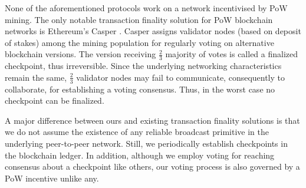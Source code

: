 None of the aforementioned protocols work on a network incentivised by PoW mining. The only notable transaction finality solution for PoW blockchain networks is Ethereum's Casper \cite{casper-gadget}. Casper assigns validator nodes (based on deposit of stakes) among the mining population for regularly voting on alternative blockchain versions. The version receiving $\frac{2}{3}$ majority of votes is called a finalized checkpoint, thus irreversible. Since the underlying networking characteristics remain the same, $\frac{2}{3}$ validator nodes may fail to communicate, consequently to collaborate, for establishing a voting consensus. Thus, in the worst case no checkpoint can be finalized.                

A major difference between ours and existing transaction finality solutions is that we do not assume the existence of any reliable broadcast primitive in the underlying peer-to-peer network. Still, we periodically establish checkpoints in the blockchain ledger. In addition, although we employ voting for reaching consensus about a checkpoint like others, our voting process is also governed by a PoW incentive unlike any. 